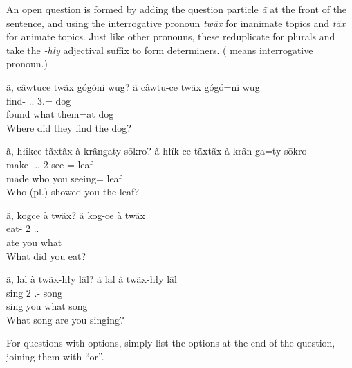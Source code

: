 \documentclass[12pt]{article}
\begin{document}
    An open question is formed by adding the question particle \textit{ã}
    at the front of the sentence,
    and using the interrogative pronoun \textit{twãx} for inanimate topics
    and \textit{tãx} for animate topics.
    Just like other pronouns, these reduplicate for plurals
    and take the \textit{-hły} adjectival suffix to form determiners.
    (\Int{} means interrogative pronoun.)

    \begin{exe}
        \ex
        \glt
        ã, câwtuce twãx gógóni wug?
        \glll
        ã câwtu-ce twãx gógó=ni wug \\
        \Q{} find-\Pst{} \Int{}.\Inanim{}.\Sg{} 3\Pl{}.\Anim{}=\InessTwo{} dog \\
        \Q{} found what them=at dog \\
        \glt
        Where did they find the dog?
    \end{exe}

    \begin{exe}
        \ex
        \glt
        ã, hłîkce tãxtãx à krângaty sōkro?
        \glll
        ã hłîk-ce tãxtãx à krân-ga=ty sōkro \\
        \Q{} make-\Pst{} \Int{}.\Anim{}.\Pl{} 2\Sg{} see-\Ger{}=\Poss{} leaf \\
        \Q{} made who you seeing=\Poss{} leaf \\
        \glt
        Who (pl.) showed you the leaf?
    \end{exe}

    \begin{exe}
        \ex
        \glt
        ã, kōgce à twãx?
        \glll
        ã kōg-ce à twãx \\
        \Q{} eat-\Pst{} 2\Sg{} \Int{}.\Inanim{}.\Sg{} \\
        \Q{} ate you what \\
        \glt
        What did you eat?
    \end{exe}

    \begin{exe}
        \ex
        \glt
        ã, lāl à twãx-hły lâl?
        \glll
        ã lāl à twãx-hły lâl \\
        \Q{} sing 2\Sg{} \Int{}.\Inanim{}-\Adj{} song \\
        \Q{} sing you what song \\
        \glt
        What song are you singing?
    \end{exe}

    For questions with options,
    simply list the options at the end of the question,
    joining them with ``or''.
\end{document}
